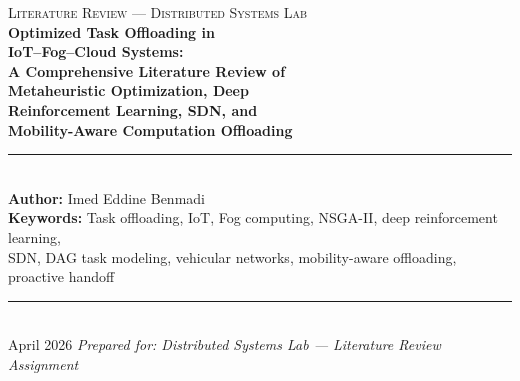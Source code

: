 \documentclass[12pt,a4paper]{article}
\begin{document}
\begin{titlepage}
  \centering
  \vspace*{2cm}
  {\small\textsc{Literature Review --- Distributed Systems Lab}}\\[1.0cm]
  {\LARGE\bfseries
    Optimized Task Offloading in\\[0.4em]
    IoT--Fog--Cloud Systems:\\[0.5em]
    A Comprehensive Literature Review of\\[0.4em]
    Metaheuristic Optimization, Deep\\[0.3em]
    Reinforcement Learning, SDN, and\\[0.3em]
    Mobility-Aware Computation Offloading
  }\\[1.4cm]
  \rule{0.55\linewidth}{0.5pt}\\[1.2cm]
  {\normalsize
    \textbf{Author:} Imed Eddine Benmadi\\[0.5cm]
    \textbf{Keywords:} Task offloading, IoT, Fog computing, NSGA-II,
    deep reinforcement learning,\\
    SDN, DAG task modeling, vehicular networks,
    mobility-aware offloading, proactive handoff
  }\\[1.4cm]
  \rule{0.55\linewidth}{0.5pt}\\[1.0cm]
  {\normalsize April 2026}
  \vfill
  {\small\textit{Prepared for: Distributed Systems Lab --- Literature Review Assignment}}
\end{titlepage}
\end{document}
